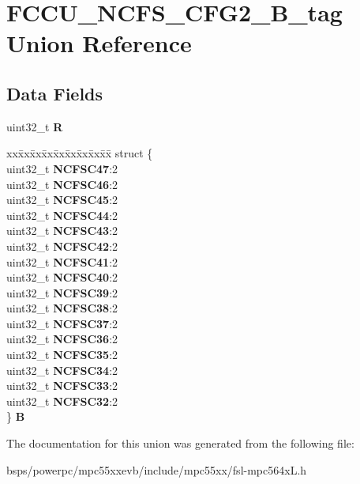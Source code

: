 \hypertarget{unionFCCU__NCFS__CFG2__32B__tag}{}\section{F\+C\+C\+U\+\_\+\+N\+C\+F\+S\+\_\+\+C\+F\+G2\+\_\+B\+\_\+tag Union Reference}
\label{unionFCCU__NCFS__CFG2__32B__tag}
\subsection*{Data Fields}
\begin{DoxyCompactItemize}
\item 
\mbox{\label{unionFCCU__NCFS__CFG2__32B__tag_a5911a907507d3ab425701e38bae8ca83}} 
uint32\+\_\+t {\bfseries R}
\item 
\mbox{\label{unionFCCU__NCFS__CFG2__32B__tag_aa91fc5f25d4cf476f83b08a4a1a5153e}} 
\begin{tabbing}
xx\=xx\=xx\=xx\=xx\=xx\=xx\=xx\=xx\=\kill
struct \{\\
\>uint32\_t {\bfseries NCFSC47}:2\\
\>uint32\_t {\bfseries NCFSC46}:2\\
\>uint32\_t {\bfseries NCFSC45}:2\\
\>uint32\_t {\bfseries NCFSC44}:2\\
\>uint32\_t {\bfseries NCFSC43}:2\\
\>uint32\_t {\bfseries NCFSC42}:2\\
\>uint32\_t {\bfseries NCFSC41}:2\\
\>uint32\_t {\bfseries NCFSC40}:2\\
\>uint32\_t {\bfseries NCFSC39}:2\\
\>uint32\_t {\bfseries NCFSC38}:2\\
\>uint32\_t {\bfseries NCFSC37}:2\\
\>uint32\_t {\bfseries NCFSC36}:2\\
\>uint32\_t {\bfseries NCFSC35}:2\\
\>uint32\_t {\bfseries NCFSC34}:2\\
\>uint32\_t {\bfseries NCFSC33}:2\\
\>uint32\_t {\bfseries NCFSC32}:2\\
\} {\bfseries B}\\

\end{tabbing}\end{DoxyCompactItemize}


The documentation for this union was generated from the following file\+:\begin{DoxyCompactItemize}
\item 
bsps/powerpc/mpc55xxevb/include/mpc55xx/fsl-\/mpc564x\+L.\+h\end{DoxyCompactItemize}
